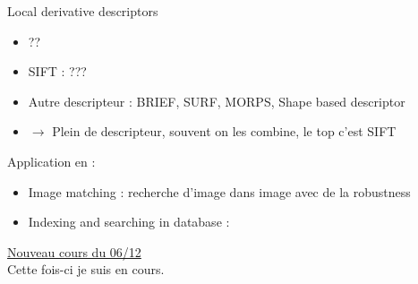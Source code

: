 \documentclass{article}
\theoremstyle{plain}%
\theoremstyle{definition}
\theoremstyle{remark}
\begin{document}
Local derivative descriptors
\begin{itemize}
    \item ??
    \item SIFT : ???
    \item Autre descripteur : BRIEF, SURF, MORPS, Shape based descriptor
    \item $\rightarrow$ Plein de descripteur, souvent on les combine, le top c'est SIFT 
\end{itemize}

Application en :
\begin{itemize}
    \item Image matching : recherche d'image dans image avec de la robustness
    \item Indexing and searching in database : 
\end{itemize}

\underline{Nouveau cours du 06/12} \\
Cette fois-ci je suis en cours.
\end{document}
